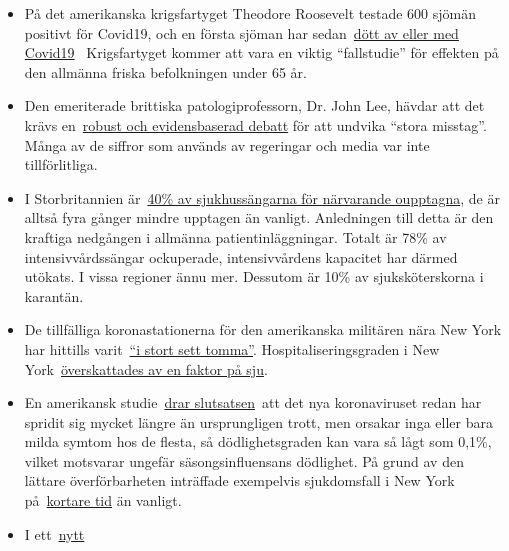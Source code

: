 \begin{itemize}
\tightlist
\item
  På det amerikanska krigsfartyget Theodore Roosevelt testade 600 sjömän
  positivt för Covid19, och en första sjöman har
  sedan~\href{https://www.theguardian.com/world/2020/apr/14/sailor-dies-from-covid-19-and-600-test-positive-after-outbreak-on-uss-theodore-roosevelt-guam}{dött
  av eller med Covid19}~ Krigsfartyget kommer att vara en viktig
  ``fallstudie'' för effekten på den allmänna friska befolkningen under
  65 år.
\item
  Den emeriterade brittiska patologiprofessorn, Dr. John Lee, hävdar att
  det krävs
  en~\href{https://www.spectator.co.uk/article/to-understand-covid-we-need-evidence-scepticism-and-vigorous-debate}{robust
  och evidensbaserad debatt} för att undvika ``stora misstag''. Många av
  de siffror som används av regeringar och media var inte
  tillförlitliga.
\item
  I Storbritannien
  är~\href{https://www.hsj.co.uk/acute-care/nhs-hospitals-have-four-times-more-empty-beds-than-normal/7027392.article}{40\%
  av sjukhussängarna för närvarande oupptagna}, de är alltså fyra gånger
  mindre upptagen än vanligt. Anledningen till detta är den kraftiga
  nedgången i allmänna patientinläggningar. Totalt är 78\% av
  intensivvårdssängar ockuperade, intensivvårdens kapacitet har därmed
  utökats. I vissa regioner ännu mer. Dessutom är 10\% av
  sjuksköterskorna i karantän.
\item
  De tillfälliga koronastationerna för den amerikanska militären nära
  New York har hittills
  varit~\href{https://nypost.com/2020/04/09/usns-comfort-and-javits-center-mostly-empty-amid-coronavirus/}{``i
  stort sett tomma''}. Hospitaliseringsgraden i New
  York~\href{https://www.nytimes.com/2020/04/10/nyregion/new-york-coronavirus-hospitals.html}{överskattades
  av en faktor på sju}.
\item
  En amerikansk
  studie~\href{https://www.medrxiv.org/content/10.1101/2020.04.01.20050542v1}{drar
  slutsatsen}~att det nya koronaviruset redan har spridit sig mycket
  längre än ursprungligen trott, men orsakar inga eller bara milda
  symtom hos de flesta, så dödlighetsgraden kan vara så lågt som 0,1\%,
  vilket motsvarar ungefär säsongsinfluensans dödlighet. På grund av den
  lättare överförbarheten inträffade exempelvis sjukdomsfall i New York
  på~\href{https://archive.is/7w2XE}{kortare tid} än vanligt.
\item
  I
  ett~\href{https://www.evms.edu/media/evms_public/departments/internal_medicine/EVMS_Critical_Care_COVID-19_Protocol.pdf}{nytt
}
\end{itemize}
